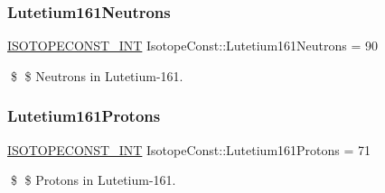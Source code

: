 \subsubsection{\texorpdfstring{Lutetium161\+Neutrons}{Lutetium161Neutrons}}
{\footnotesize\ttfamily \mbox{\hyperlink{group___isotope_const-_macros_ga5f18360b3e99483a35c32d789e62621c}{I\+S\+O\+T\+O\+P\+E\+C\+O\+N\+S\+T\+\_\+\+I\+NT}} Isotope\+Const\+::\+Lutetium161\+Neutrons = 90}

\$ \$ Neutrons in Lutetium-\/161. \mbox{\label{group___isotope_const-_lutetium-_lu161_ga6994b8cf59c0dcec64e88b36383a1c18}} 
\subsubsection{\texorpdfstring{Lutetium161\+Protons}{Lutetium161Protons}}
{\footnotesize\ttfamily \mbox{\hyperlink{group___isotope_const-_macros_ga5f18360b3e99483a35c32d789e62621c}{I\+S\+O\+T\+O\+P\+E\+C\+O\+N\+S\+T\+\_\+\+I\+NT}} Isotope\+Const\+::\+Lutetium161\+Protons = 71}

\$ \$ Protons in Lutetium-\/161. 